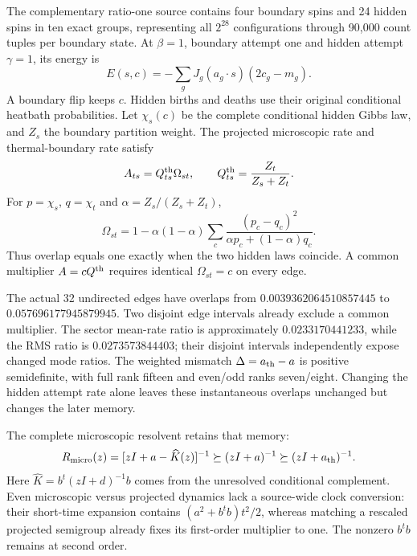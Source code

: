 The complementary ratio-one source contains four boundary spins and 24 hidden spins in ten exact groups, representing all $2^{28}$ configurations through 90,000 count tuples per boundary state. At $\beta=1$, boundary attempt one and hidden attempt $\gamma=1$, its energy is
\begin{equation}
 E(s,c)=-\sum_gJ_g(a_g\cdot s)(2c_g-m_g).
\end{equation}
A boundary flip keeps $c$. Hidden births and deaths use their original conditional heatbath probabilities. Let $\chi_s(c)$ be the complete conditional hidden Gibbs law, and $Z_s$ the boundary partition weight. The projected microscopic rate and thermal-boundary rate satisfy
\begin{equation}
 A_{ts}=Q^{\rm th}_{ts}\Omega_{st},\qquad
 Q^{\rm th}_{ts}=\frac{Z_t}{Z_s+Z_t}.
\end{equation}
For $p=\chi_s$, $q=\chi_t$ and $\alpha=Z_s/(Z_s+Z_t)$,
\begin{equation}
 \Omega_{st}=1-\alpha(1-\alpha)
 \sum_c\frac{(p_c-q_c)^2}{\alpha p_c+(1-\alpha)q_c}.
\end{equation}
Thus overlap equals one exactly when the two hidden laws coincide. A common multiplier $A=cQ^{\rm th}$ requires identical $\Omega_{st}=c$ on every edge.

The actual 32 undirected edges have overlaps from $0.0039362064510857445$ to $0.057696177945879945$. Two disjoint edge intervals already exclude a common multiplier. The sector mean-rate ratio is approximately $0.0233170441233$, while the RMS ratio is $0.0273573844403$; their disjoint intervals independently expose changed mode ratios. The weighted mismatch $\Delta=a_{\rm th}-a$ is positive semidefinite, with full rank fifteen and even/odd ranks seven/eight. Changing the hidden attempt rate alone leaves these instantaneous overlaps unchanged but changes the later memory.

The complete microscopic resolvent retains that memory:
\begin{equation}
 R_{\rm micro}(z)=[zI+a-\widehat K(z)]^{-1}
 \succeq(zI+a)^{-1}\succeq(zI+a_{\rm th})^{-1}.
\end{equation}
Here $\widehat K=b^t(zI+d)^{-1}b$ comes from the unresolved conditional complement. Even microscopic versus projected dynamics lack a source-wide clock conversion: their short-time expansion contains $(a^2+b^tb)t^2/2$, whereas matching a rescaled projected semigroup already fixes its first-order multiplier to one. The nonzero $b^tb$ remains at second order.


